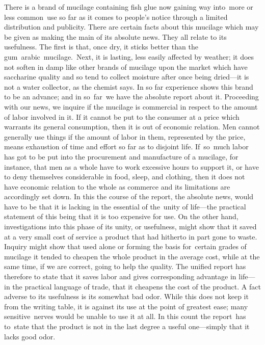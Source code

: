 \documentclass[twoside,symmetric,nobib,justified]{tufte-book}
\begin{document}
There is a brand of mucilage containing fish glue now gaining way
into~more or less common~use so far as it comes to people's notice
through a limited distribution and publicity. There are certain facts
about this mucilage which may be given as making the main of its
absolute news. They all relate to its usefulness. The first is that,
once dry, it sticks better than the gum~arabic~mucilage.~Next, it is
lasting, less easily affected by weather; it does not soften in damp
like other brands of mucilage upon the market which have saccharine
quality and so tend to collect moisture after once being dried---it is
not a water collector, as the chemist says. In so far experience shows
this brand to be an advance; and in so~far~we have the absolute report
about it. Proceeding with our news, we inquire if the mucilage is
commercial in respect to the amount of labor involved in it. If it
cannot be put to the consumer at a price which warrants its general
consumption, then it is out of economic relation. Men cannot generally
use things if the amount of labor in them, represented by the price,
means exhaustion of time and effort so far as to disjoint life.
If~so~much labor has got to be put into the procurement and manufacture
of a mucilage, for instance, that men as a whole have to work excessive
hours to support it, or have to deny themselves considerable in food,
sleep, and clothing, then it does not have economic relation to the
whole as commerce and its limitations are accordingly set down. In this
the course of the report, the absolute news, would have to be that it is
lacking in the essential of the~unity of life---the practical statement
of this being that it is too expensive for use. On the other hand,
investigations into this phase of its unity, or usefulness, might show
that it saved at a very small cost of service a product that had
hitherto in part gone to waste. Inquiry might show that used alone or
forming the basis for~certain grades of mucilage it tended to cheapen
the whole product in the average cost, while at the same time, if we are
correct, going to help the quality. The unified report has therefore to
state that it saves labor and gives corresponding advantage in life---in
the practical language of trade, that it cheapens the cost of the
product. A fact adverse to its usefulness is its somewhat bad odor.
While this does not keep it from the writing table, it is against its
use at the point of greatest ease; many sensitive~nerves would be unable
to use it at all. In this count the report~has to~state that the product
is not in the last degree a useful one---simply that it lacks good odor.
\end{document}
